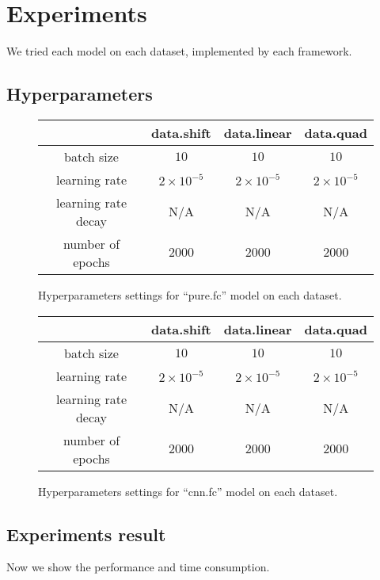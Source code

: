 \documentclass[a4paper]{article}
\begin{document}
\section{Experiments}

We tried each model on each dataset, implemented by each framework.

\subsection{Hyperparameters}

\begin{figure}[H]
\centering
\begin{tabular}{|c|c|c|c|}
\hline
 & data.shift & data.linear & data.quad \\
\hline
batch size & $10$ & $10$ & $10$ \\
\hline
learning rate & $2\times10^{-5}$ & $2\times10^{-5}$ & $2\times10^{-5}$\\
\hline
learning rate decay & N/A & N/A & N/A \\
\hline
number of epochs & $2000$ & $2000$ & $2000$ \\
\hline
\end{tabular}
\caption{Hyperparameters settings for ``pure.fc'' model on each dataset.}
\end{figure}

\begin{figure}[H]
\centering
\begin{tabular}{|c|c|c|c|}
\hline
 & data.shift & data.linear & data.quad \\
\hline
batch size & $10$ & $10$ & $10$ \\
\hline
learning rate & $2\times10^{-5}$ & $2\times10^{-5}$ & $2\times10^{-5}$\\
\hline
learning rate decay & N/A & N/A & N/A \\
\hline
number of epochs & $2000$ & $2000$ & $2000$ \\
\hline
\end{tabular}
\caption{Hyperparameters settings for ``cnn.fc'' model on each dataset.}
\end{figure}

\subsection{Experiments result}

Now we show the performance and time consumption.
\end{document}

